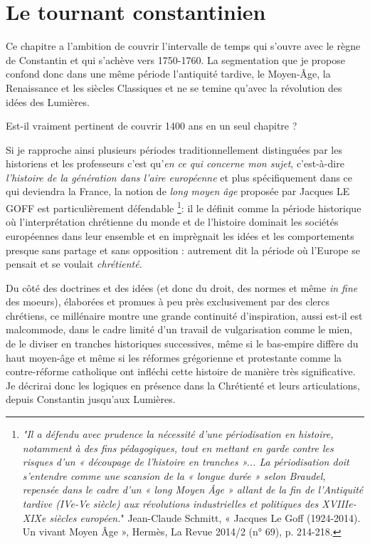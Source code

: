 

\chapter{Le tournant constantinien}
 Ce chapitre a l'ambition de couvrir l'intervalle de temps qui s'ouvre avec le règne de Constantin et qui s'achève vers 1750-1760.
 La segmentation que je propose confond donc dans une même période l'antiquité tardive, le Moyen-Âge, la Renaissance et les siècles Classiques et ne se temine qu'avec la révolution des idées des Lumières. 
 
 Est-il vraiment pertinent de couvrir 1400 ans en un seul chapitre ?
 
 Si je rapproche ainsi plusieurs périodes traditionnellement distinguées par les historiens et les professeurs c'est qu'\emph{en ce qui concerne mon sujet}, c'est-à-dire \emph{l'histoire de la génération dans l'aire européenne} et plus spécifiquement dans ce qui deviendra la France, la notion de \emph{long moyen âge} proposée par Jacques LE GOFF est particulièrement défendable \footnote{\emph{"Il a défendu avec prudence la nécessité d’une périodisation en histoire, notamment à des fins pédagogiques, tout en mettant en garde contre les risques d’un « découpage de l’histoire en tranches »... La périodisation doit s’entendre comme une scansion de la « longue durée » selon Braudel, repensée dans le cadre d’un « long Moyen Âge » allant de la fin de l’Antiquité tardive (IVe-Ve siècle) aux révolutions industrielles et politiques des XVIIIe-XIXe siècles européen.}" Jean-Claude Schmitt, « Jacques Le Goff (1924-2014). Un vivant Moyen Âge », Hermès, La Revue 2014/2 (n° 69), p. 214-218.}: il le définit comme la période historique où l'interprétation chrétienne du monde et de l'histoire dominait les sociétés européennes dans leur ensemble et en imprègnait les idées et les comportements presque sans partage et sans opposition : autrement dit la période où l'Europe se pensait et se voulait \emph{chrétienté}. 

Du côté des doctrines et des idées (et donc du droit, des normes et même \emph{in fine} des moeurs), élaborées et promues à peu près exclusivement par des clercs chrétiens, ce millénaire montre une grande continuité d'inspiration, aussi est-il est malcommode, dans le cadre limité d'un travail de vulgarisation comme le mien, de le diviser en tranches historiques successives, même si le bas-empire diffère du haut moyen-âge et même si les réformes grégorienne et protestante comme la contre-réforme catholique ont infléchi cette histoire de manière très significative. Je décrirai donc les logiques en présence dans la Chrétienté et leurs articulations, depuis Constantin jusqu'aux Lumières.

